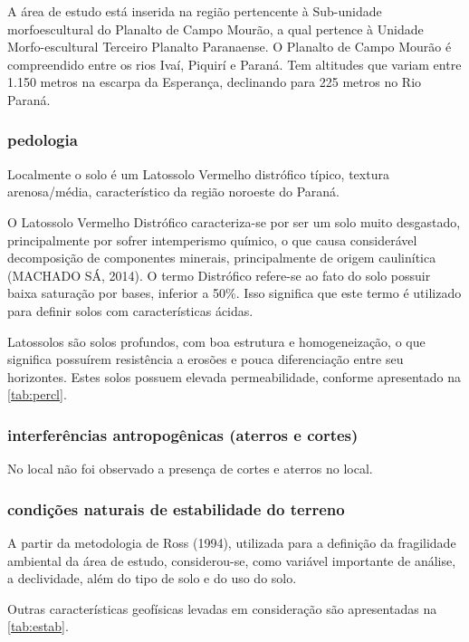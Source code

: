 A área de estudo está inserida na região pertencente à Sub-unidade morfoescultural do Planalto de Campo Mourão, a qual pertence à Unidade Morfo-escultural Terceiro Planalto Paranaense.
O Planalto de Campo Mourão é compreendido entre os rios Ivaí, Piquirí e Paraná. Tem altitudes que variam entre 1.150 metros na escarpa da Esperança, declinando para 225 metros no Rio Paraná.



\subsubsection{pedologia}
Localmente o solo é um Latossolo Vermelho distrófico
típico, textura arenosa/média, característico da região noroeste do Paraná.

O Latossolo Vermelho Distrófico caracteriza-se por ser um solo muito desgastado, principalmente por sofrer intemperismo químico, o que causa considerável decomposição de componentes minerais, principalmente de origem
caulinítica (MACHADO SÁ, 2014).
O termo Distrófico refere-se ao fato do solo possuir baixa saturação por
bases, inferior a 50\%. Isso significa que este termo é utilizado para definir solos com
características ácidas.

Latossolos são solos profundos, com
boa estrutura e homogeneização, o que significa possuírem resistência a erosões e
pouca diferenciação entre seu horizontes. Estes solos possuem elevada
permeabilidade, conforme apresentado 
na \cref{tab:percl}.

\subsubsection{interferências antropogênicas (aterros e cortes)}

No local não foi observado a presença de cortes e aterros no local.

\subsubsection{condições naturais de estabilidade do terreno}

A partir da metodologia de Ross (1994), utilizada para a
definição da fragilidade ambiental da área de estudo,
considerou-se, como variável importante de análise,
a declividade, além do tipo de solo e do uso do solo.

Outras características geofísicas levadas em consideração
são apresentadas na \cref{tab:estab}.

